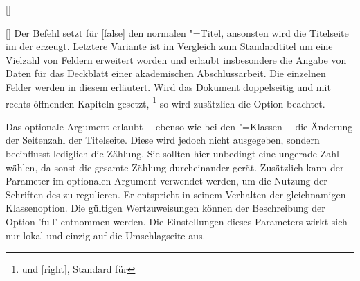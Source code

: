 \begin{Declaration}{}
\begin{Declaration}[v2.02]{%
  []%
}
\begin{Declaration}[v2.02]{[\PSet]}
\printdeclarationlist%
%
%
%
Der Befehl  setzt für [false] den normalen 
\KOMAScript"=Titel{}, ansonsten wird die Titelseite im \CD der \TnUD erzeugt. 
Letztere Variante ist im Vergleich zum Standardtitel um eine Vielzahl von 
Feldern erweitert worden und erlaubt insbesondere die Angabe von Daten für das 
Deckblatt einer akademischen Abschlussarbeit. Die einzelnen Felder werden in 
diesem \autorefname erläutert. Wird das Dokument doppelseitig und mit rechts 
öffnenden Kapiteln gesetzt,%
\footnote{%
   und [right], Standard für 
}
so wird zusätzlich die Option  beachtet.

Das optionale Argument erlaubt~-- ebenso wie bei den \KOMAScript"=Klassen~-- 
die Änderung der Seitenzahl der Titelseite. Diese wird jedoch nicht ausgegeben, 
sondern beeinflusst lediglich die Zählung. Sie sollten hier unbedingt eine 
ungerade Zahl wählen, da sonst die gesamte Zählung durcheinander gerät. 
Zusätzlich kann der Parameter  im optionalen 
Argument verwendet werden, um die Nutzung der Schriften des \CDs zu regulieren. 
Er entspricht in seinem Verhalten der gleichnamigen Klassenoption. Die gültigen 
Wertzuweisungen können der Beschreibung der Option 'full' 
entnommen werden. Die Einstellungen dieses Parameters wirkt sich nur lokal und 
einzig auf die Umschlagseite aus.
\end{Declaration}
\end{Declaration}
\end{Declaration}

